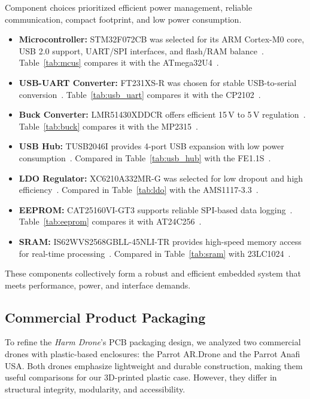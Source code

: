 \documentclass[12pt]{article}
\begin{document}
Component choices prioritized efficient power management, reliable communication, compact footprint, and low power consumption.

\begin{itemize}
    \item \textbf{Microcontroller:} STM32F072CB was selected for its ARM Cortex-M0 core, USB 2.0 support, UART/SPI interfaces, and flash/RAM balance~\cite{stm2023}. Table~\ref{tab:mcus} compares it with the ATmega32U4~\cite{atmel2023}.

    \item \textbf{USB-UART Converter:} FT231XS-R was chosen for stable USB-to-serial conversion~\cite{ftdi2023}. Table~\ref{tab:usb_uart} compares it with the CP2102~\cite{silabs2023}.

    \item \textbf{Buck Converter:} LMR51430XDDCR offers efficient 15\,V to 5\,V regulation~\cite{ti2023b}. Table~\ref{tab:buck} compares it with the MP2315~\cite{mp2315}.

    \item \textbf{USB Hub:} TUSB2046I provides 4-port USB expansion with low power consumption~\cite{ti2023a}. Compared in Table~\ref{tab:usb_hub} with the FE1.1S~\cite{fe1hub}.

    \item \textbf{LDO Regulator:} XC6210A332MR-G was selected for low dropout and high efficiency~\cite{torex2023}. Compared in Table~\ref{tab:ldo} with the AMS1117-3.3~\cite{ams1117}.

    \item \textbf{EEPROM:} CAT25160VI-GT3 supports reliable SPI-based data logging~\cite{onsemi2023}. Table~\ref{tab:eeprom} compares it with AT24C256~\cite{at24c256}.

    \item \textbf{SRAM:} IS62WVS2568GBLL-45NLI-TR provides high-speed memory access for real-time processing~\cite{issi2023}. Compared in Table~\ref{tab:sram} with 23LC1024~\cite{microchip2023}.
\end{itemize}

These components collectively form a robust and efficient embedded system that meets performance, power, and interface demands.

\subsection{Commercial Product Packaging}

To refine the \textit{Harm Drone}’s PCB packaging design, we analyzed two commercial drones with plastic-based enclosures: the Parrot AR.Drone and the Parrot Anafi USA. Both drones emphasize lightweight and durable construction, making them useful comparisons for our 3D-printed plastic case. However, they differ in structural integrity, modularity, and accessibility.
\end{document}
